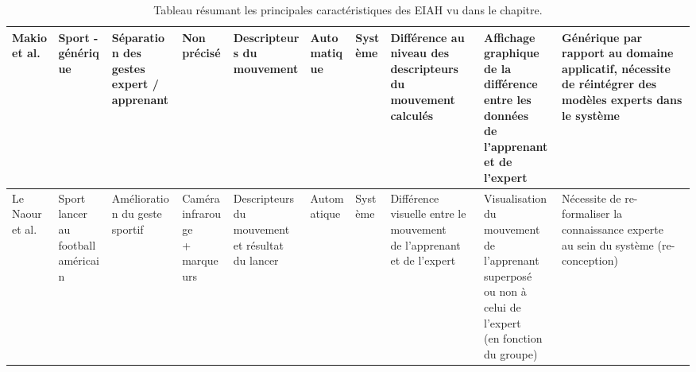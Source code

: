 \begin{landscape}
\begin{table}[]
{\begin{tabular}{|l|l|l|l|l|l|l|l|l|l|}
Makio et al. & Sport - générique & \makecell[l]{Séparation des gestes\\expert / apprenant} & Non précisé & Descripteurs du mouvement & Automatique & Système & \makecell[l]{Différence au niveau des\\descripteurs du mouvement calculés} & \makecell[l]{Affichage graphique de la\\différence entre les données\\de l'apprenant et de l'expert} & \makecell[l]{Générique par rapport au domaine applicatif, nécessite\\de réintégrer des modèles experts dans le système} \\ \hline

Le Naour et al. & \makecell[l]{Sport\\lancer au football\\américain} & Amélioration du geste sportif & \makecell[l]{Caméra infrarouge\\+ marqueurs} & \makecell[l]{Descripteurs du mouvement\\et résultat du lancer} & Automatique & Système & \makecell[l]{Différence visuelle entre le mouvement\\de l'apprenant et de l'expert} & \makecell[l]{Visualisation du mouvement\\de l'apprenant superposé\\ou non à celui de l'expert\\(en fonction du groupe)} & \makecell[l]{Nécessite de re-formaliser la connaissance experte\\au sein du système (re-conception)} \\ \hline

\end{tabular}}
\caption{Tableau résumant les principales caractéristiques des EIAH vu dans le chapitre.}
\label{tab:eiah_tab}
\end{table}
\end{landscape}
\pagebreak

